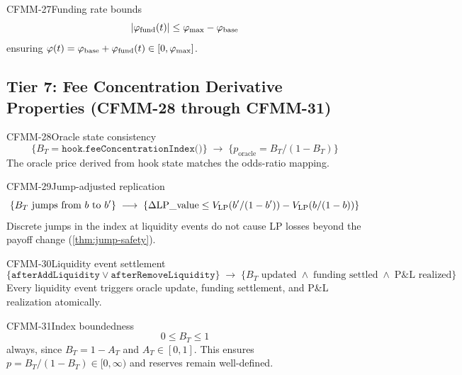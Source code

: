 \begin{invariant}{CFMM-27}{Funding rate bounds}
\[
  |\varphi_{\text{fund}}(t)| \leq \varphi_{\max} - \varphi_{\text{base}}
\]
ensuring $\varphi(t) = \varphi_{\text{base}} + \varphi_{\text{fund}}(t) \in [0, \varphi_{\max}]$.
\end{invariant}

\subsection{Tier 7: Fee Concentration Derivative Properties (CFMM-28 through CFMM-31)}

\begin{invariant}{CFMM-28}{Oracle state consistency}
\[
  \{B_T = \texttt{hook.feeConcentrationIndex()}\}
  \;\longrightarrow\;
  \{p_{\text{oracle}} = B_T / (1 - B_T)\}
\]
The oracle price derived from hook state matches the odds-ratio mapping.
\end{invariant}

\begin{invariant}{CFMM-29}{Jump-adjusted replication}
\[
  \{B_T \text{ jumps from } b \text{ to } b'\}
  \;\longrightarrow\;
  \{\Delta\text{LP\_value} \leq V_{\mathrm{LP}}(b'/(1-b')) - V_{\mathrm{LP}}(b/(1-b))\}
\]
Discrete jumps in the index at liquidity events do not cause LP losses beyond the
payoff change (\cref{thm:jump-safety}).
\end{invariant}

\begin{invariant}{CFMM-30}{Liquidity event settlement}
\[
  \{\texttt{afterAddLiquidity} \lor \texttt{afterRemoveLiquidity}\}
  \;\longrightarrow\;
  \{B_T \text{ updated} \;\land\; \text{funding settled} \;\land\; \text{P\&L realized}\}
\]
Every liquidity event triggers oracle update, funding settlement, and P\&L
realization atomically.
\end{invariant}

\begin{invariant}{CFMM-31}{Index boundedness}
\[
  0 \leq B_T \leq 1
\]
always, since $B_T = 1 - A_T$ and $A_T \in [0, 1]$. This ensures
$p = B_T/(1-B_T) \in [0, \infty)$ and reserves remain well-defined.
\end{invariant}
